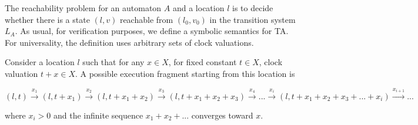 The reachability problem for an automaton $A$ and a location $l$ is to decide whether there is a state $(l,v)$ reachable from $(l_{0},v_{0})$ in the transition system $L_{A}$. As usual, for verification purposes, we define a symbolic semantics for TA. For universality, the definition uses arbitrary sets of clock valuations.

Consider a location $l$ such that for any $x \in X$, for fixed constant $t \in X$, clock valuation $t + x \in X$. A possible execution fragment starting from this location is

$(l,t) \xrightarrow{x_{1}} (l,t+x_{1}) \xrightarrow{x_{2}} (l,t+x_{1}+x_{2}) \xrightarrow{x_{3}} (l,t+x_{1}+x_{2}+x_{3}) \xrightarrow{x_{4}}...\xrightarrow{x_{i}}(l,t+x_{1}+x_{2}+x_{3}+...+x_{i}) \xrightarrow{x_{i+1}}...$

where $x_{i} > 0$ and the infinite sequence $x_{1} + x_{2} + . . .$ converges toward $x$. 





